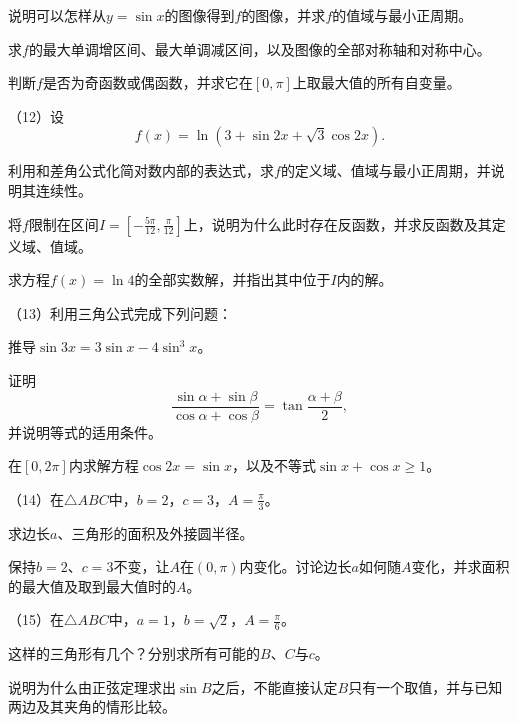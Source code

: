 \begin{exercise}
\quad {}说明可以怎样从\(y = \sin x\)的图像得到\(f\)的图像，并求\(f\)的值域与最小正周期。

\quad {}求\(f\)的最大单调增区间、最大单调减区间，以及图像的全部对称轴和对称中心。

\quad {}判断\(f\)是否为奇函数或偶函数，并求它在\([0 , \pi]\)上取最大值的所有自变量。

（12）设
\begin{equation*}
    f(x) = \ln \left( 3 + \sin 2 x + \sqrt{3} \cos 2 x \right) .
\end{equation*}

\quad {}利用和差角公式化简对数内部的表达式，求\(f\)的定义域、值域与最小正周期，并说明其连续性。

\quad {}将\(f\)限制在区间\(I = \left[ - \frac{5 \pi}{12} , \frac{\pi}{12} \right]\)上，说明为什么此时存在反函数，并求反函数及其定义域、值域。

\quad {}求方程\(f(x) = \ln 4\)的全部实数解，并指出其中位于\(I\)内的解。

（13）利用三角公式完成下列问题：

\quad {}推导\(\sin 3 x = 3 \sin x - 4 \sin^{3} x\)。

\quad {}证明
\begin{equation*}
    \frac{\sin \alpha + \sin \beta}{\cos \alpha + \cos \beta}
    = \tan \frac{\alpha + \beta}{2} ,
\end{equation*}
并说明等式的适用条件。

\quad {}在\([0 , 2 \pi]\)内求解方程\(\cos 2 x = \sin x\)，以及不等式\(\sin x + \cos x \ge 1\)。

（14）在\(\triangle A B C\)中，\(b = 2\)，\(c = 3\)，\(A = \frac{\pi}{3}\)。

\quad {}求边长\(a\)、三角形的面积及外接圆半径。

\quad {}保持\(b = 2\)、\(c = 3\)不变，让\(A\)在\((0 , \pi)\)内变化。讨论边长\(a\)如何随\(A\)变化，并求面积的最大值及取到最大值时的\(A\)。

（15）在\(\triangle A B C\)中，\(a = 1\)，\(b = \sqrt{2}\)，\(A = \frac{\pi}{6}\)。

\quad {}这样的三角形有几个？分别求所有可能的\(B\)、\(C\)与\(c\)。

\quad {}说明为什么由正弦定理求出\(\sin B\)之后，不能直接认定\(B\)只有一个取值，并与已知两边及其夹角的情形比较。
\end{exercise}
